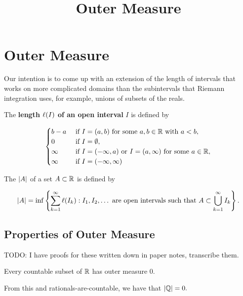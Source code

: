 \documentclass{article}
\title{Outer Measure}
\begin{document}
\section{Outer Measure}

Our intention is to come up with an \@{extension} of the \@{length} of \@{intervals} that works on more complicated \@{domains} than the \@{subintervals} that \@{Riemann integration} uses, for example, \@{unions} of \@{subsets} of the \@{reals}.

\begin{definition}
\notation{\length}{\ell}

	The \textbf{length $\ell(I)$ of an \@{open interval}} $I$ is defined by

	\[ \begin{cases}
		b - a & \text{ if } I = (a,b) \text{ for some } a,b \in \mathbb{R} \text{ with } a < b, \\
		0 & \text{ if } I = \emptyset, \\
		\infty & \text{ if } I = (-\infty,a) \text{ or } I = (a, \infty) \text{ for some } a \in \mathbb{R}, \\
		\infty & \text{ if } I = (-\infty,\infty) \\
	\end{cases} \]
\end{definition}

\begin{definition}
	The  $\left| A \right|$ of a \@{set} $A \subset \mathbb{R}$ is defined by

	\[ \left| A \right| = \inf \left\{ \sum_{k=1}^{\infty} \ell(I_k) : I_1, I_2, \dots \text{ are open intervals such that } A \subset \bigcup_{k=1}^\infty I_k \right\}. \]
\end{definition}

\subsection{Properties of Outer Measure}\label{outer-measure-properties}
TODO: I have proofs for these written down in paper notes, transcribe them.

\begin{theorem}
	Every \@{countable} \@{subset} of $\mathbb{R}$ has \@{outer measure} 0.
\end{theorem}
\begin{corollary}
	From this and \@{rationals-are-countable}, we have that $\left| \mathbb{Q} \right| = 0.$
\end{corollary}
\end{document}
